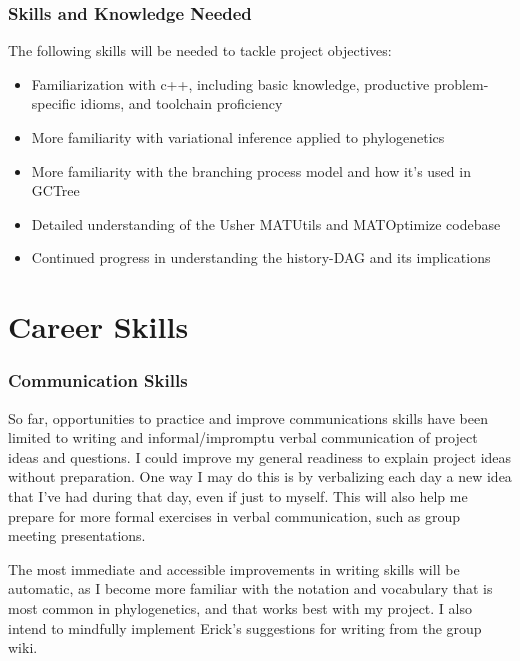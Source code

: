 \documentclass{paper}
\begin{document}
\subsubsection*{Skills and Knowledge Needed}
The following skills will be needed to tackle project objectives:
\begin{itemize}
    \item Familiarization with c++, including basic knowledge, productive problem-specific idioms, and toolchain proficiency
    \item More familiarity with variational inference applied to phylogenetics
    \item More familiarity with the branching process model and how it's used in GCTree
    \item Detailed understanding of the Usher MATUtils and MATOptimize codebase
    \item Continued progress in understanding the history-DAG and its implications
\end{itemize}

\section*{Career Skills}

\subsubsection*{Communication Skills}
So far, opportunities to practice and improve communications skills have been limited to writing and informal/impromptu verbal communication of project ideas and questions.
I could improve my general readiness to explain project ideas without preparation.
One way I may do this is by verbalizing each day a new idea that I've had during that day, even if just to myself.
This will also help me prepare for more formal exercises in verbal communication, such as group meeting presentations.

The most immediate and accessible improvements in writing skills will be automatic, as I become more familiar with the notation and vocabulary that is most common in phylogenetics, and that works best with my project.
I also intend to mindfully implement Erick's suggestions for writing from the group wiki.
\end{document}
